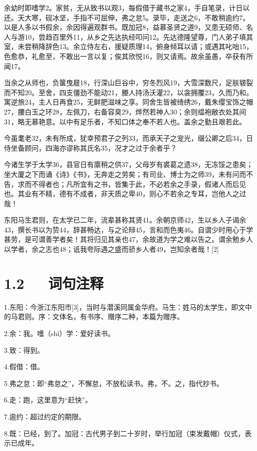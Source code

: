 \documentclass[letterpaper,12pt,english]{sphinxmanual}
\begin{document}
余幼时即嗜学2。家贫，无从致书以观3，每假借于藏书之家4，手自笔录，计日以还。天大寒，砚冰坚，手指不可屈伸，弗之怠5。录毕，走送之6，不敢稍逾约7。以是人多以书假余，余因得遍观群书。既加冠8，益慕圣贤之道9，又患无硕师、名人与游10，尝趋百里外11，从乡之先达执经叩问12。先达德隆望尊，门人弟子填其室，未尝稍降辞色13。余立侍左右，援疑质理14，俯身倾耳以请；或遇其叱咄15，色愈恭，礼愈至，不敢出一言以复；俟其欣悦16，则又请焉。故余虽愚，卒获有所闻17。

当余之从师也，负箧曳屣18，行深山巨谷中，穷冬烈风19，大雪深数尺，足肤皲裂而不知20。至舍，四支僵劲不能动21，媵人持汤沃灌22，以衾拥覆23，久而乃和。寓逆旅24，主人日再食25，无鲜肥滋味之享。同舍生皆被绮绣26，戴朱缨宝饰之帽27，腰白玉之环28，左佩刀，右备容臭29，烨然若神人30；余则缊袍敝衣处其间31，略无慕艳意。以中有足乐者，不知口体之奉不若人也。盖余之勤且艰若此。

今虽耄老32，未有所成，犹幸预君子之列33，而承天子之宠光，缀公卿之后34，日侍坐备顾问，四海亦谬称其氏名35，况才之过于余者乎？

今诸生学于太学36，县官日有廪稍之供37，父母岁有裘葛之遗38，无冻馁之患矣；坐大厦之下而诵《诗》《书》，无奔走之劳矣；有司业、博士为之师39，未有问而不告，求而不得者也；凡所宜有之书，皆集于此，不必若余之手录，假诸人而后见也。其业有不精，德有不成者，非天质之卑40，则心不若余之专耳，岂他人之过哉！

东阳马生君则，在太学已二年，流辈甚称其贤41。余朝京师42，生以乡人子谒余43，撰长书以为贽44，辞甚畅达，与之论辩45，言和而色夷46。自谓少时用心于学甚劳，是可谓善学者矣！其将归见其亲也47，余故道为学之难以告之。谓余勉乡人以学者，余之志也48；诋我夸际遇之盛而骄乡人者49，岂知余者哉！{[}2{]}


\section{1.2   词句注释}
\label{\detokenize{p01_u6563_u6587/_u5b8b_u6fc2-_u9001_u4e1c_u9633_u9a6c_u751f_u5e8f:id4}}
1.东阳：今浙江东阳市{[}3{]}，当时与潜溪同属金华府。马生：姓马的太学生，即文中的马君则。序：文体名，有书序、赠序二种，本篇为赠序。

2.余：我。嗜（shì）学：爱好读书。

3.致：得到。

4.假借：借。

5.弗之怠：即“弗怠之”，不懈怠，不放松读书。弗，不。之，指代抄书。

6.走：跑，这里意为“赶快”。

7.逾约：超过约定的期限。

8.既：已经，到了。加冠：古代男子到二十岁时，举行加冠（束发戴帽）仪式，表示已成年。
\end{document}
